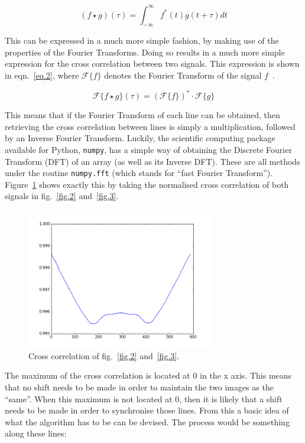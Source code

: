 \documentclass[a4paper,12pt]{article}
\begin{document}
\begin{equation}
 (f \star g)(\tau) = \int_{-\infty}^{\infty} f^*(t) g(t+\tau) dt
 \label{eq.1}
\end{equation}

This can be expressed in a much more simple fashion, by making use of the properties of the Fourier Transforms. Doing so results in a much more simple expression for the cross correlation between two signals. This expression is shown in eqn.~\ref{eq.2}, where $\mathcal{F}\{ f \}$ denotes the Fourier Transform of the signal $f$~\cite{bracewell2012fourier}.

\begin{equation}
 \mathcal{F}\{ f \star g \}(\tau) = (\mathcal{F}\{ f \})^* \cdot \mathcal{F}\{ g \}
 \label{eq.2}
\end{equation}

This means that if the Fourier Transform of each line can be obtained, then retrieving the cross correlation between lines is simply a multiplication, followed by an Inverse Fourier Transform. Luckily, the scientific computing package available for Python, \texttt{numpy}, has a simple way of obtaining the Discrete Fourier Transform (DFT) of an array (as well as its Inverse DFT). These are all methods under the routine \texttt{numpy.fft} (which stands for ``fast Fourier Transform''). Figure~\ref{fig.4} shows exactly this by taking the normalised cross correlation of both signals in fig.~\ref{fig.2} and~\ref{fig.3}. 

\begin{figure}[h!]
\centering
\includegraphics[width=0.73\textwidth]{img/xcorrelation}
\caption{Cross correlation of fig.~\ref{fig.2} and~\ref{fig.3}.}
\label{fig.4}
\end{figure}

The maximum of the cross correlation is located at 0 in the x axis. This means that no shift needs to be made in order to maintain the two images as the ``same''. When this maximum is not located at 0, then it is likely that a shift needs to be made in order to synchronise those lines. From this a basic idea of what the algorithm has to be can be devised. The process would be something along these lines: 
\end{document}
